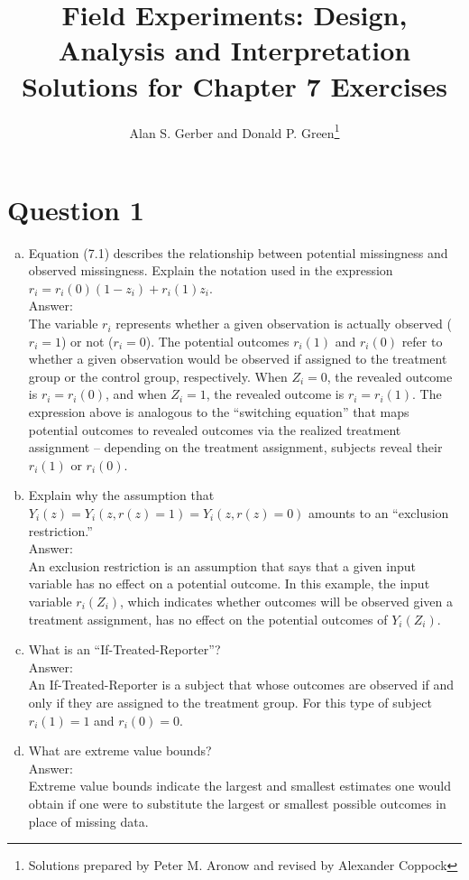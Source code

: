\documentclass[11pt,notitlepage]{article}\usepackage[]{graphicx}\usepackage[]{color}
\title{Field Experiments: Design, Analysis and Interpretation \\
Solutions for Chapter 7 Exercises}
\author{Alan S. Gerber and Donald P. Green\footnote{Solutions prepared by Peter M. Aronow and revised by Alexander Coppock}}
\date{\vspace{-5ex}}
\begin{document}
\maketitle

\section*{Question 1}
\begin{enumerate}[a)]
\item Equation (7.1) describes the relationship between potential missingness and observed
missingness. Explain the notation used in the expression $r_i = r_i(0)(1 - z_i) + r_i(1)z_i$.\\
Answer:\\
The variable $r_i$ represents whether a given observation is actually observed ($r_i=1$) or not ($r_i=0$).  The potential outcomes $r_i(1)$ and $r_i(0)$ refer to whether a given observation would be observed if assigned to the treatment group or the control group, respectively.  When $Z_i=0$, the revealed outcome is $r_i=r_i(0)$, and when $Z_i=1$, the revealed outcome is $r_i=r_i(1)$. The expression above is analogous to the ``switching equation'' that maps potential outcomes to revealed outcomes via the realized treatment assignment -- depending on the treatment assignment, subjects reveal their $r_i(1)$ or $r_i(0)$.

\item Explain why the assumption that $Y_i(z) = Y_i(z, r(z) = 1) = Y_i(z, r(z) = 0)$ amounts to an ``exclusion restriction.'' \\
Answer:\\
An exclusion restriction is an assumption that says that a given input variable has no effect on a potential outcome.  In this example, the input variable $r_i(Z_i)$, which indicates whether outcomes will be observed given a treatment assignment, has no effect on the potential outcomes of $Y_i(Z_i ).$
\item What is an ``If-Treated-Reporter''?\\
Answer:\\
An If-Treated-Reporter is a subject that whose outcomes are observed if and only if they are assigned to the treatment group. For this type of subject $r_i(1)=1$ and $r_i(0)=0$. 
\item What are extreme value bounds? \\
Answer:\\
Extreme value bounds indicate the largest and smallest estimates one would obtain if one were to substitute the largest or smallest possible outcomes in place of missing data.
\end{enumerate}
\end{document}
